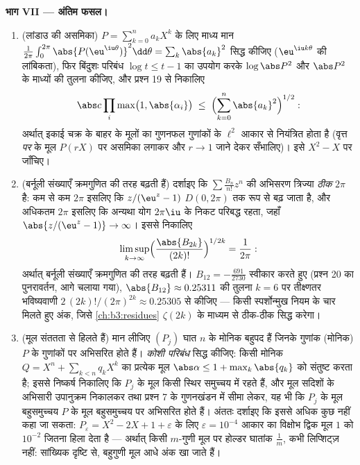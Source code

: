 \begin{problem}
\medskip
\noindent\textbf{भाग VII --- अंतिम फसल।}
\begin{enumerate}[resume]
  \item (लांडाउ की असमिका) $P = \sum_{k=0}^na_kX^k$ के लिए माध्य मान $\frac1{2\pi}\int_0^{2\pi}
        \abs{P(\eu^{\iu\theta})}^2\dd\theta =
        \sum_k\abs{a_k}^2$ सिद्ध
        कीजिए ($\eu^{\iu k\theta}$ की लांबिकता), फिर बिंदुशः परिबंध $\log t \leq t - 1$ का
        उपयोग करके $\log\abs P^2$ और $\abs P^2$ के माध्यों की तुलना कीजिए, और
        प्रश्न 19 से निकालिए
        \[
        \abs c\prod_{i}\max\bigl(1, \abs{\alpha_i}\bigr)
        \;\leq\;
        \Bigl(\sum_{k=0}^{n}\abs{a_k}^2\Bigr)^{1/2} :
        \]
        अर्थात् इकाई चक्र के बाहर के मूलों का गुणनफल गुणांकों के
        $\ell^2$ आकार से नियंत्रित होता है (वृत्त \emph{पर} के मूल
        $P(rX)$ पर असमिका लगाकर और $r \to 1$ जाने देकर सँभालिए)। इसे
        $X^2 - X$ पर जाँचिए।
  \item (बर्नूली संख्याएँ क्रमगुणित की तरह बढ़ती हैं) दर्शाइए कि
        $\sum\frac{B_n}{n!}z^n$ की अभिसरण त्रिज्या \emph{ठीक} $2\pi$ है: कम से कम
        $2\pi$ इसलिए कि $z/(\eu^z - 1)$ $D(0, 2\pi)$ तक  रूप से बढ़ जाता
        है, और अधिकतम $2\pi$ इसलिए कि अन्यथा योग $2\pi\iu$ के निकट
        परिबद्ध रहता, जहाँ $\abs{z/(\eu^z-1)} \to \infty$। इससे निकालिए
        \[
        \limsup_{k\to\infty}
        \Bigl(\frac{\abs{B_{2k}}}{(2k)!}\Bigr)^{1/2k}
        = \frac1{2\pi} :
        \]
        अर्थात् बर्नूली संख्याएँ क्रमगुणित की तरह बढ़ती हैं।
        $B_{12}
        = -\frac{691}{2730}$ स्वीकार करते हुए (प्रश्न 20 का पुनरावर्तन, आगे
        चलाया गया), $\abs{B_{12}} \approx 0.25311$ की तुलना $k = 6$ पर तीक्ष्णतर भविष्यवाणी
        $2\,(2k)!/(2\pi)^{2k}
        \approx 0.25305$ से कीजिए --- किसी स्पर्शोन्मुख नियम के चार मिलते
        हुए अंक, जिसे \cref{ch:b3:residues} $\zeta(2k)$ के माध्यम से ठीक-ठीक सिद्ध
        करेगा।
  \item (मूल संततता से हिलते हैं) मान लीजिए $(P_j)$ घात $n$ के
        मोनिक बहुपद हैं जिनके गुणांक (मोनिक) $P$ के गुणांकों पर
        अभिसरित होते हैं। \emph{कोशी परिबंध} सिद्ध कीजिए: किसी
        मोनिक $Q = X^n + \sum_{k<n}q_kX^k$ का प्रत्येक मूल $\abs\alpha \leq 1 + \max_k\abs{q_k}$ को संतुष्ट करता है;
        इससे निष्कर्ष निकालिए कि $P_j$ के मूल किसी स्थिर 
        समुच्चय में रहते हैं, और मूल सदिशों के अभिसारी उपानुक्रम
        निकालकर तथा प्रश्न 7 के गुणनखंडन में सीमा लेकर, यह भी कि
        $P_j$ के मूल बहुसमुच्चय $P$ के मूल बहुसमुच्चय पर
        अभिसरित होते हैं। अंततः दर्शाइए कि इससे अधिक कुछ नहीं कहा
        जा सकता: $P_\varepsilon = X^2 - 2X + 1 +
        \varepsilon$ के लिए $\varepsilon =
        10^{-4}$ आकार का विक्षोभ द्विक मूल
        $1$ को $10^{-2}$ जितना हिला देता है --- अर्थात् किसी
        $m$-गुणी मूल पर होल्डर घातांक $\frac1m$, कभी लिप्शिट्ज़ नहीं:
        सांख्यिक दृष्टि से, बहुगुणी मूल आधे अंक खा जाते हैं।
\end{enumerate}
\end{problem}
